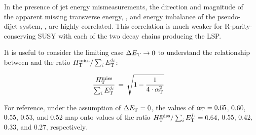 In the presence of jet energy mismeasurements, the direction and
magnitude of the apparent missing transverse energy, \mht, and energy
imbalance of the pseudo-dijet system, \dEt, are highly correlated.
This correlation is much weaker for R-parity-conserving SUSY with each
of the two decay chains producing the LSP.

It is useful to consider the limiting case $\Delta{E_{\text T}} \rightarrow 0$ to
understand the relationship between \alphat and the ratio
$\mbox{$H_{\rm T}^{\rm miss}$}/\sum_{i} E_\textrm{T}^{j_i}$:

\begin{equation}
  \label{eq:alphat3}
  \frac{\mbox{$H_{\rm T}^{\rm miss}$}}{\sum_{i} E_\textrm{T}^{j_i}} \, = \, \sqrt{ 1 - \frac{1}{4 \cdot \alpha_{\text{T}}^2} }
\end{equation}

For reference, under the assumption of $\Delta{E_{\text T}} = 0$, the values of
$\alpha_{\text{T}} = 0.65$, 0.60, 0.55, 0.53, and 0.52 map onto values of the ratio
$\mbox{$H_{\rm T}^{\rm miss}$}/\sum_{i} E_\textrm{T}^{j_i} = 0.64$, 0.55, 0.42, 0.33, and 0.27, 
respectively.


